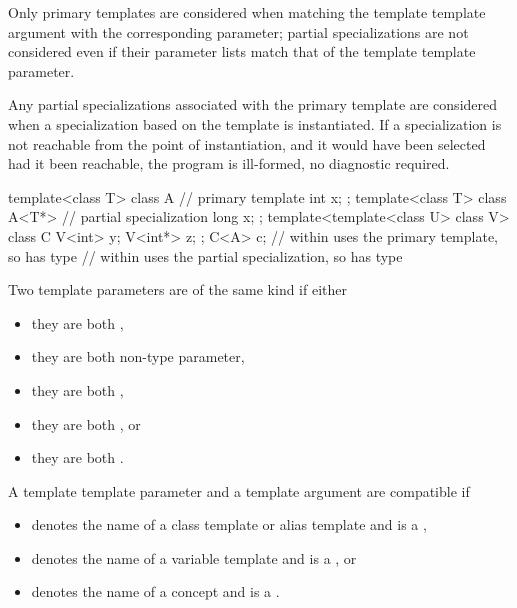 \documentclass{wg21}
\begin{document}
Only primary templates are considered when matching the template template
argument with the corresponding parameter; partial specializations are not
considered even if their parameter lists match that of the template template
parameter.

\pnum
Any partial specializations associated with the
primary template are considered when a
specialization based on the template
is instantiated.
If a specialization is not reachable from the point of instantiation,
and it would have been selected had it been reachable, the program is ill-formed,
no diagnostic required.
\begin{example}
    \begin{codeblock}
        template<class T> class A {     // primary template
            int x;
        };
        template<class T> class A<T*> { // partial specialization
            long x;
        };
        template<template<class U> class V> class C {
            V<int>  y;
            V<int*> z;
        };
        C<A> c;             //  within  uses the primary template, so  has type 
        //  within  uses the partial specialization, so  has type 
    \end{codeblock}
\end{example}

\begin{addedblock}
Two template parameters are of the same kind if either
\begin{itemize}
\item they are both ,
\item they are both non-type parameter,
\item they are both ,
\item they are both , or
\item they are both .
\end{itemize}

A template template parameter  and a template argument  are compatible if
\begin{itemize}
\item {} denotes the name of a class template or alias template and  is a ,
\item {} denotes the name of a variable template and  is a , or
\item {} denotes the name of a concept and  is a .
\end{itemize}

\end{addedblock}
\end{document}
